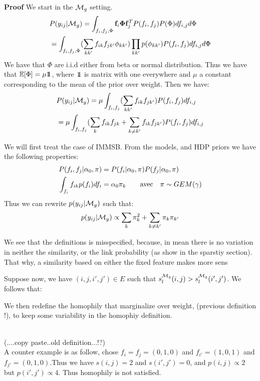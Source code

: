 \noindent \textbf{Proof} We start in the $\mathcal{M}_g$ setting.
\begin{align*}
&P(y_{ij}|\mathcal{M}_g) = \int_{f_i, f_j,\Phi} \mathbf{f}_i\mathbf{\Phi} \mathbf{f}_j^T P(f_i, f_j) P(\Phi) df_{i,j}d\Phi \\
& = \int_{f_i, f_j,\Phi} (\sum_{kk'}f_{ik}f_{jk'}\phi_{kk'}) \prod_{kk'}p(\phi_{kk'}) P(f_i, f_j)  df_{i,j}d\Phi
\end{align*}
We have that $\Phi$ are i.i.d either from beta or normal distribution. Thus we have that $\mathbb{E}[\Phi] = \mu 1\!\!1$, where $1\!\!1$ is matrix with one everywhere and $\mu$ a constant corresponding to the mean of the prior over weight. Then we have:
\begin{align*}
&P(y_{ij}|\mathcal{M}_g) =  \mu \int_{f_i, f_j} (\sum_{kk'}f_{ik}f_{jk'})  P(f_i, f_j)  df_{i,j} \\
&= \mu \int_{f_i, f_j} (\sum_kf_{ik}f_{jk} +  \sum_{k \neq k'}f_{ik}f_{jk'})  P(f_i, f_j)  df_{i,j}
\end{align*}

We will first treat the case of IMMSB. From the models, and HDP priors we have the following properties:
\begin{align*}
P(f_i,f_j|\alpha_0, \pi) &= P(f_i|\alpha_0,\pi)P(f_j|\alpha_0,\pi) \\
\int_{f_i} f_{ik} p(f_i)df_i &= \alpha_0 \pi_k \qquad \textnormal{avec} \quad \mathbf{\pi} \sim GEM(\gamma)
\end{align*}
Thus we can rewrite $p(y_{ij}|\mathcal{M}_g)$ such that:
\begin{align*}
p(y_{ij}|\mathcal{M}_g) \propto  \sum_k \pi_k^2 + \sum_{k\neq k'} \pi_k \pi_{k'}
\end{align*}

We see that the definitions is misspecified, because, in mean there is no variation in neither the similarity, or the link probability (as show in the sparstiy section). That why, a similarity based on either the fixed feature makes more sens 

Suppose now, we have $(i,j,i',j') \in E$ such that $s_l^{\mathcal{M}_g}(i,j) > s_l^{\mathcal{M}_g}(i',j')$. We follows that:

We then redefine the homophily that marginalize over weight, (previous definition !), to keep some variability in the homophiy definition.

~\\
(....copy paste..old definition...!?)
~\\

A counter example is as follow, chose $f_i=f_j=(0,1,0)$ and $f_{i'}=(1,0,1)$ and $f_{j'}=(0,1,0)$.Thus we have $s(i,j)=2$ and $s(i',j')=0$, and $p(i,j) \propto 2$ but $p(i',j') \propto 4$. Thus homophily is not satisfied. 








